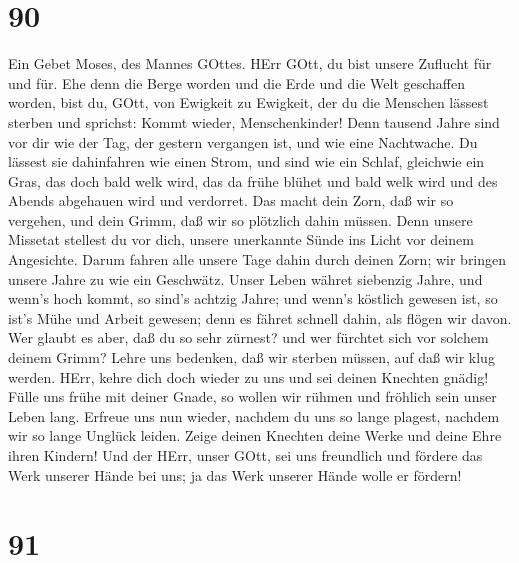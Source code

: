\hypertarget{section-89}{%
\section{90}\label{section-89}}

 Ein Gebet Moses, des Mannes GOttes.  HErr GOtt,
du bist unsere Zuflucht für und für. Ehe denn die Berge worden und die
Erde und die Welt geschaffen worden, bist du, GOtt, von Ewigkeit zu
Ewigkeit,  der du die Menschen lässest sterben und sprichst:
Kommt wieder, Menschenkinder!  Denn tausend Jahre sind vor
dir wie der Tag, der gestern vergangen ist, und wie eine Nachtwache.
 Du lässest sie dahinfahren wie einen Strom, und sind wie
ein Schlaf, gleichwie ein Gras, das doch bald welk wird, 
das da frühe blühet und bald welk wird und des Abends abgehauen wird und
verdorret.  Das macht dein Zorn, daß wir so vergehen, und
dein Grimm, daß wir so plötzlich dahin müssen.  Denn unsere
Missetat stellest du vor dich, unsere unerkannte Sünde ins Licht vor
deinem Angesichte.  Darum fahren alle unsere Tage dahin
durch deinen Zorn; wir bringen unsere Jahre zu wie ein Geschwätz.
 Unser Leben währet siebenzig Jahre, und wenn's hoch kommt,
so sind's achtzig Jahre; und wenn's köstlich gewesen ist, so ist's Mühe
und Arbeit gewesen; denn es fähret schnell dahin, als flögen wir davon.
 Wer glaubt es aber, daß du so sehr zürnest? und wer
fürchtet sich vor solchem deinem Grimm?  Lehre uns
bedenken, daß wir sterben müssen, auf daß wir klug werden. 
HErr, kehre dich doch wieder zu uns und sei deinen Knechten gnädig!
 Fülle uns frühe mit deiner Gnade, so wollen wir rühmen und
fröhlich sein unser Leben lang.  Erfreue uns nun wieder,
nachdem du uns so lange plagest, nachdem wir so lange Unglück leiden.
 Zeige deinen Knechten deine Werke und deine Ehre ihren
Kindern!  Und der HErr, unser GOtt, sei uns freundlich und
fördere das Werk unserer Hände bei uns; ja das Werk unserer Hände wolle
er fördern!

\hypertarget{section-90}{%
\section{91}\label{section-90}}

